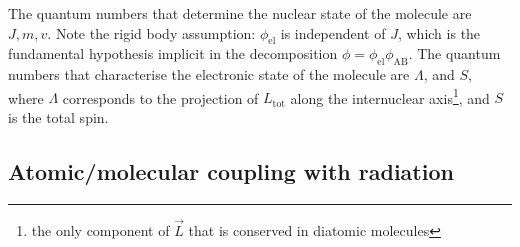 \begin{frame}
\end{frame} \begin{frame}\frametitle{} 

The quantum numbers that determine the nuclear state of the molecule
are $J,m,v$. Note the rigid body assumption: $\phi_\mathrm{el}$ is
independent of $J$, which is the fundamental hypothesis implicit in
the decomposition $\phi = \phi_\mathrm{el} \phi_\mathrm{AB}$. The
quantum numbers that characterise the electronic state of the molecule
are $\Lambda$, and $S$, where $\Lambda$ corresponds to the projection
of $L_\mathrm{tot}$ along the internuclear axis\footnote{the only
component of $\vec{L}$ that is conserved in diatomic molecules}, and
$S$ is the total spin.




\end{frame}

\subsection{Atomic/molecular coupling with radiation}

